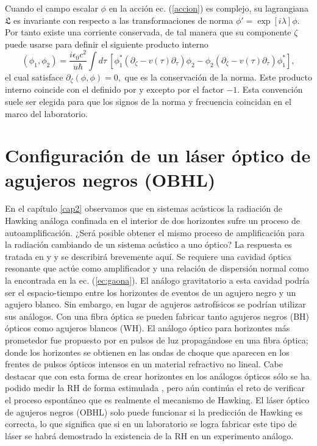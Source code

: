 Cuando el campo escalar $\phi$ en la acci\'{o}n ec. (\ref{accion}) es complejo, su lagrangiana $\mathfrak{L}$  es invariante con respecto a las
transformaciones de norma $\phi'=\exp[i\lambda]\phi$. Por tanto existe una corriente conservada, de tal manera que su componente $\zeta$  puede usarse para definir el siguiente producto interno
\begin{equation}\label{productointerno}
(\phi_1,\phi_2)=\frac{i\epsilon_0c^2}{u\hbar}\int d\tau \ [\phi_1^*(\partial_{\zeta}-v(\tau)\partial_{\tau})\phi_2-\phi_2(\partial_{\zeta}-v(\tau)\partial_{\tau})\phi_1^*],
\end{equation}
el cual satisface $\partial_{\zeta}(\phi,\phi)=0,$ que es la conservaci\'{o}n de la norma. Este producto interno coincide con el definido por \cite{philbin2008fiber} y \cite{Robertson2011} excepto por el factor $-1$. Esta convención suele ser elegida para que los signos de la norma y frecuencia coincidan en el marco del laboratorio. 


\section{Configuraci\'{o}n de un l\'{a}ser \'{o}ptico de agujeros negros (OBHL)}\label{OBHL}
En el cap\'{i}tulo \ref{cap2} observamos que en sistemas ac\'{u}sticos la radiaci\'{o}n de Hawking an\'{a}loga confinada en el interior de dos horizontes sufre un proceso de autoamplificaci\'{o}n. ¿Ser\'{a} posible obtener el mismo proceso de amplificaci\'{o}n para la radiaci\'{o}n cambiando de un sistema ac\'{u}stico a  uno \'{o}ptico? La respuesta es tratada en \cite{Faccio2012} y \cite{GaonaReyes2017} y se describir\'{a} brevemente aqu\'{i}. Se requiere una cavidad óptica resonante que actúe como amplificador y una relaci\'{o}n de dispersi\'{o}n normal como la encontrada en la ec. (\ref{ec:gaona}). El análogo gravitatorio a esta cavidad podría ser el espacio-tiempo entre los horizontes de eventos de un agujero negro y un agujero blanco. Sin embargo, en lugar de agujeros astrof\'{i}sicos se podrían utilizar sus análogos. Con una fibra óptica se pueden fabricar tanto agujeros negros (BH) ópticos como agujeros blancos (WH). El análogo óptico para horizontes más prometedor fue propuesto por \cite{philbin2008fiber} en pulsos de luz propag\'andose en una fibra óptica; donde los horizontes se obtienen en las ondas de choque que aparecen en los frentes de pulsos ópticos intensos en un material refractivo no lineal. Cabe destacar que con esta forma de crear horizontes en los análogos ópticos s\'{o}lo se ha podido medir la RH de forma estimulada \citep{drori2019observation}, pero a\'{u}n contin\'{u}a el reto de verificar el proceso espontáneo que es realmente el mecanismo de Hawking. El láser óptico de agujeros negros (OBHL) solo puede funcionar si la predicción de Hawking es correcta, lo que significa que si en un laboratorio se logra fabricar este tipo de láser se habrá demostrado la existencia de la RH en un experimento an\'{a}logo.\\

